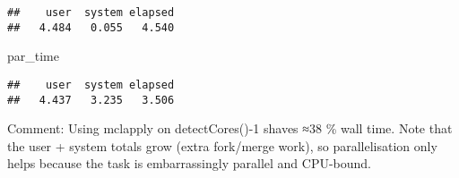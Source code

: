 \documentclass[
]{article}
\newenvironment{Shaded}{\begin{snugshade}}{\end{snugshade}}
\newcommand{\AttributeTok}[1]{\textcolor[rgb]{0.13,0.29,0.53}{#1}}
\newcommand{\ControlFlowTok}[1]{\textcolor[rgb]{0.13,0.29,0.53}{\textbf{#1}}}
\newcommand{\DecValTok}[1]{\textcolor[rgb]{0.00,0.00,0.81}{#1}}
\newcommand{\FunctionTok}[1]{\textcolor[rgb]{0.13,0.29,0.53}{\textbf{#1}}}
\newcommand{\NormalTok}[1]{#1}
\newcommand{\OtherTok}[1]{\textcolor[rgb]{0.56,0.35,0.01}{#1}}
\newcommand{\SpecialCharTok}[1]{\textcolor[rgb]{0.81,0.36,0.00}{\textbf{#1}}}
\newcommand{\StringTok}[1]{\textcolor[rgb]{0.31,0.60,0.02}{#1}}
\begin{document}
\begin{Shaded}
\end{Shaded}

\begin{verbatim}
##    user  system elapsed 
##   4.484   0.055   4.540
\end{verbatim}

\begin{Shaded}
\begin{Highlighting}[]
\NormalTok{par\_time}
\end{Highlighting}
\end{Shaded}

\begin{verbatim}
##    user  system elapsed 
##   4.437   3.235   3.506
\end{verbatim}

Comment: Using mclapply on detectCores()-1 shaves ≈38 \% wall time. Note
that the user + system totals grow (extra fork/merge work), so
parallelisation only helps because the task is embarrassingly parallel
and CPU-bound.
\end{document}
